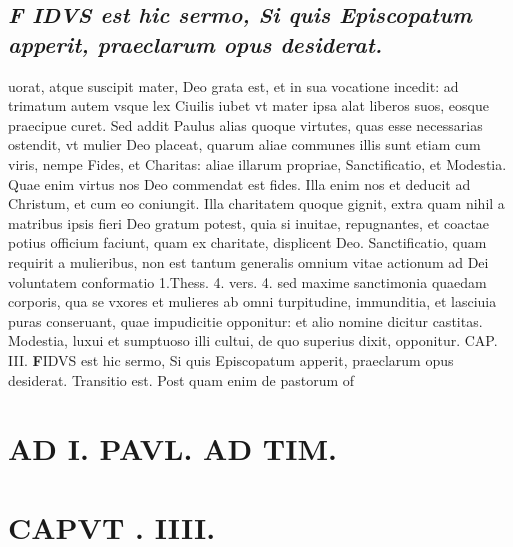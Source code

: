 \documentclass{article}
\begin{document}
\begin{pages}
\subsection*{\textit{F IDVS est hic sermo, Si quis Episcopatum apperit, praeclarum opus desiderat.}}uorat, atque suscipit mater, Deo grata est, et in sua vocatione incedit: ad trimatum autem vsque lex Ciuilis iubet vt mater ipsa alat liberos suos, eosque praecipue curet. Sed addit Paulus alias quoque virtutes, quas esse necessarias ostendit, vt mulier Deo placeat, quarum aliae communes illis sunt etiam cum viris, nempe Fides, et Charitas: aliae illarum propriae, Sanctificatio, et Modestia. Quae enim virtus nos Deo commendat est fides. Illa enim nos et deducit ad Christum, et cum eo coniungit. Illa charitatem quoque gignit, extra quam nihil a matribus ipsis fieri Deo gratum potest, quia si inuitae, repugnantes, et coactae potius officium faciunt, quam ex charitate, displicent Deo. Sanctificatio, quam requirit a mulieribus, non est tantum generalis omnium vitae actionum ad Dei voluntatem conformatio 1.Thess. 4. vers. 4. sed maxime sanctimonia quaedam corporis, qua se vxores et mulieres ab omni turpitudine, immunditia, et lasciuia puras conseruant, quae impudicitie opponitur: et alio nomine dicitur castitas. Modestia, luxui et sumptuoso illi cultui, de quo superius dixit, opponitur. CAP. III.
\textbf{F}IDVS est hic sermo, Si quis Episcopatum apperit, praeclarum opus desiderat. Transitio est. Post quam enim de pastorum of\pend
\section*{AD I. PAVL. AD TIM. }
\section{CAPVT . IIII. }
\marginpar{[ p.180 ]}\pstart {}
{}

\end{pages}
\end{document}
